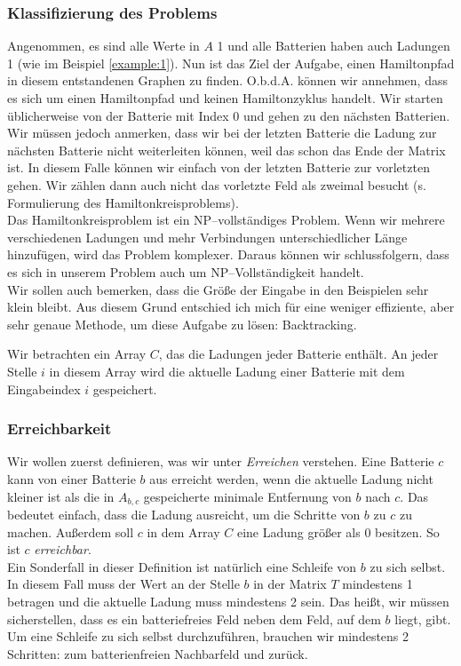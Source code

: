 \documentclass[a4paper,10pt,ngerman]{scrartcl}
\begin{document}
\subsubsection{Klassifizierung des Problems}\label{sec:classification}
Angenommen, es sind alle Werte in $A$ 1 und alle Batterien haben auch Ladungen 1 (wie im Beispiel \ref{example:1}).
Nun ist das Ziel der Aufgabe, einen Hamiltonpfad in diesem entstandenen Graphen zu finden.
O.b.d.A. können wir annehmen, dass es sich um einen Hamiltonpfad und keinen Hamiltonzyklus handelt.
Wir starten üblicherweise von der Batterie mit Index 0 und gehen zu den nächsten Batterien.
Wir müssen jedoch anmerken, dass wir bei der letzten Batterie
die Ladung zur nächsten Batterie nicht weiterleiten können, weil das schon das Ende der Matrix ist.
In diesem Falle können wir einfach von der letzten Batterie zur vorletzten gehen.
Wir zählen dann auch nicht das vorletzte Feld als zweimal besucht (s. Formulierung des Hamiltonkreisproblems).\\
Das Hamiltonkreisproblem ist ein NP--vollständiges Problem.\cite{garey_johnson_1979}
Wenn wir mehrere verschiedenen Ladungen und mehr Verbindungen unterschiedlicher Länge hinzufügen, 
wird das Problem komplexer. Daraus können wir schlussfolgern, dass es sich in unserem Problem
auch um NP--Vollständigkeit handelt.\\

Wir sollen auch bemerken, dass die Größe der Eingabe in den Beispielen sehr klein bleibt. Aus diesem Grund entschied ich mich
für eine weniger effiziente, aber sehr genaue Methode, um diese Aufgabe zu lösen: Backtracking. 

Wir betrachten ein Array $C$, das die Ladungen jeder Batterie enthält. An jeder Stelle $i$ in diesem Array wird die aktuelle
Ladung einer Batterie mit dem Eingabeindex $i$ gespeichert.

\subsubsection{Erreichbarkeit}
Wir wollen zuerst definieren, was wir unter \textit{Erreichen} verstehen.
Eine Batterie $c$ kann von einer Batterie $b$ aus erreicht werden, wenn die aktuelle Ladung nicht kleiner
ist als die in $A_{b,c}$ gespeicherte minimale Entfernung von $b$ nach $c$.
Das bedeutet einfach, dass die Ladung ausreicht, um die Schritte von $b$ zu $c$ zu machen.
Außerdem soll $c$ in dem Array $C$ eine Ladung größer als 0 besitzen. So ist $c$ \textit{erreichbar}.\\
Ein Sonderfall in dieser Definition ist natürlich eine Schleife von $b$ zu sich selbst. 
In diesem Fall muss der Wert an der Stelle $b$ in der Matrix $T$ mindestens 1 betragen und die aktuelle Ladung muss
mindestens 2 sein. Das heißt, wir müssen sicherstellen, dass es ein batteriefreies Feld neben dem Feld,
auf dem $b$ liegt, gibt. Um eine Schleife zu sich selbst durchzuführen, brauchen wir mindestens 2 Schritten:
zum batterienfreien Nachbarfeld und zurück.
\end{document}
